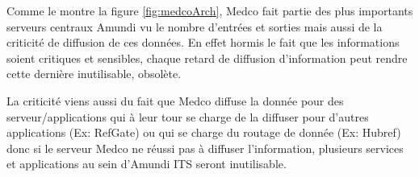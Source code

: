 \par Comme le montre la figure \ref{fig:medcoArch}, Medco fait partie des plus importants serveurs centraux Amundi vu le nombre d'entrées et sorties mais aussi de la criticité de diffusion de ces données. En effet hormis le fait que les informations soient critiques et sensibles, chaque retard de diffusion d'information peut rendre cette dernière inutilisable, obsolète.  
\par La criticité viens aussi du fait que Medco diffuse la donnée pour des serveur/applications qui à leur tour se charge de la diffuser pour d'autres applications (Ex: RefGate) ou qui se charge du routage de donnée (Ex: Hubref) donc si le serveur Medco ne réussi pas à diffuser l'information, plusieurs services et applications au sein d'Amundi ITS seront inutilisable.

